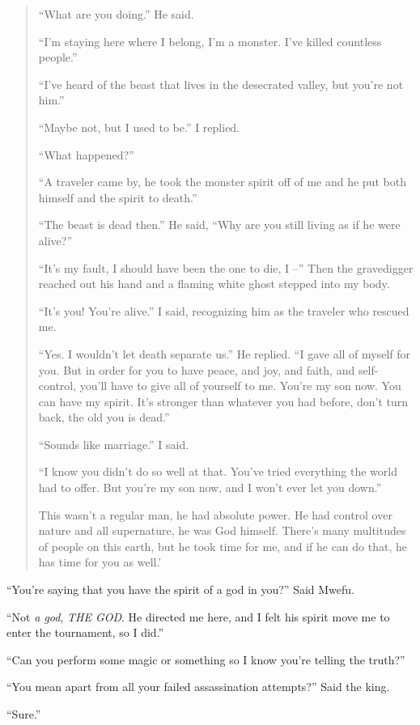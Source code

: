 \begin{quote}
``What are you doing.'' He said.

``I'm staying here where I belong, I'm a monster. I've killed countless people.''

``I've heard of the beast that lives in the desecrated valley, but you're not him.''

``Maybe not, but I used to be.'' I replied.

``What happened?''

``A traveler came by, he took the monster spirit off of me and he put both himself and the spirit to death.''

``The beast is dead then.'' He said, ``Why are you still living as if he were alive?''

``It's my fault, I should have been the one to die, I --'' Then the gravedigger reached out his hand and a flaming white ghost stepped into my body.

``It's you! You're alive.'' I said, recognizing him as the traveler who rescued me.

``Yes. I wouldn't let death separate us.'' He replied.
``I gave all of myself for you. But in order for you to have peace, and joy, and faith, and self-control, you'll have to give all of yourself to me.
You're my son now. You can have my spirit.
It's stronger than whatever you had before, don't turn back, the old you is dead.''

``Sounds like marriage.'' I said.

``I know you didn't do so well at that. You've tried everything the world had to offer. But you're my son now, and I won't ever let you down.''

This wasn't a regular man, he had absolute power. He had control over nature and all supernature, he was God himself. There's many multitudes of people on this earth, but he took time for me, and if he can do that, he has time for you as well.'
\end{quote}

``You're saying that you have the spirit of a god in you?'' Said Mwefu.

``Not \emph{a god}, \emph{THE GOD}. He directed me here, and I felt his spirit move me to enter the tournament, so I did.''

``Can you perform some magic or something so I know you're telling the truth?''

``You mean apart from all your failed assassination attempts?'' Said the king.

``Sure.''

